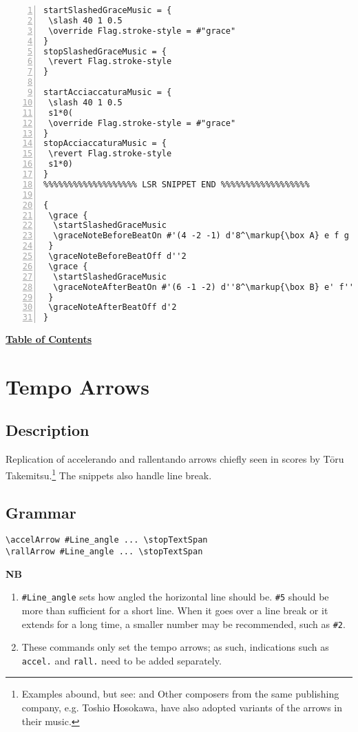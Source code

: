 \begin{Verbatim}[numbers=left,xleftmargin=5mm]
startSlashedGraceMusic = {
 \slash 40 1 0.5
 \override Flag.stroke-style = #"grace"
}
stopSlashedGraceMusic = {
 \revert Flag.stroke-style
}

startAcciaccaturaMusic = {
 \slash 40 1 0.5
 s1*0(
 \override Flag.stroke-style = #"grace"
}
stopAcciaccaturaMusic = {
 \revert Flag.stroke-style
 s1*0)
}
%%%%%%%%%%%%%%%%%%% LSR SNIPPET END %%%%%%%%%%%%%%%%%%

{
 \grace {
  \startSlashedGraceMusic
  \graceNoteBeforeBeatOn #'(4 -2 -1) d'8^\markup{\box A} e f g e' c'
 }
 \graceNoteBeforeBeatOff d''2
 \grace {
  \startSlashedGraceMusic
  \graceNoteAfterBeatOn #'(6 -1 -2) d''8^\markup{\box B} e' f'' g' e'' c'
 }
 \graceNoteAfterBeatOff d'2
}
\end{Verbatim}

\hyperref[sec:toc]{\textbf{Table of Contents}}

\vfill \break



\section {Tempo Arrows}
\hfill
{}
\hfill

\subsection{Description}

Replication of accelerando and rallentando arrows chiefly seen in scores by Tōru Takemitsu.\footnote{Examples abound, but see: \cite{RN1736} and \cite{RN1735} Other composers from the same publishing company, e.g. Toshio Hosokawa, have also adopted variants of the arrows in their music.} The snippets also handle line break.

\subsection{Grammar}
\begin{verbatim}
\accelArrow #Line_angle ... \stopTextSpan
\rallArrow #Line_angle ... \stopTextSpan
\end{verbatim}


\textbf{NB} 
\begin{enumerate}
\item \verb|#Line_angle| sets how angled the horizontal line should be. \verb|#5| should be more than sufficient for a short line.  When it goes over a line break or it extends for a long time, a smaller number may be recommended, such as \verb|#2|. 
\item These commands only set the tempo arrows; as such, indications such as \verb|accel.| and \verb|rall.| need to be added separately. 
\end{enumerate}

